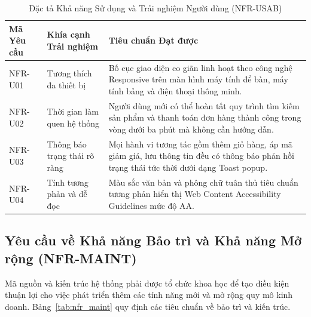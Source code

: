 \begin{table}[H]
\centering
\caption{Đặc tả Khả năng Sử dụng và Trải nghiệm Người dùng (NFR-USAB)}
\label{tab:nfr_usab}
\begin{tabularx}{\textwidth}{p{2.5cm}p{4.5cm}X}
\toprule
\textbf{Mã Yêu cầu} & \textbf{Khía cạnh Trải nghiệm} & \textbf{Tiêu chuẩn Đạt được} \\
\midrule
NFR-U01 & Tương thích đa thiết bị & Bố cục giao diện co giãn linh hoạt theo công nghệ Responsive trên màn hình máy tính để bàn, máy tính bảng và điện thoại thông minh. \\
\addlinespace
NFR-U02 & Thời gian làm quen hệ thống & Người dùng mới có thể hoàn tất quy trình tìm kiếm sản phẩm và thanh toán đơn hàng thành công trong vòng dưới ba phút mà không cần hướng dẫn. \\
\addlinespace
NFR-U03 & Thông báo trạng thái rõ ràng & Mọi hành vi tương tác gồm thêm giỏ hàng, áp mã giảm giá, lưu thông tin đều có thông báo phản hồi trạng thái tức thời dưới dạng Toast popup. \\
\addlinespace
NFR-U04 & Tính tương phản và dễ đọc & Màu sắc văn bản và phông chữ tuân thủ tiêu chuẩn tương phản hiển thị Web Content Accessibility Guidelines mức độ AA. \\
\bottomrule
\end{tabularx}
\end{table}

\subsection{Yêu cầu về Khả năng Bảo trì và Khả năng Mở rộng (NFR-MAINT)}
Mã nguồn và kiến trúc hệ thống phải được tổ chức khoa học để tạo điều kiện thuận lợi cho việc phát triển thêm các tính năng mới và mở rộng quy mô kinh doanh. Bảng~\ref{tab:nfr_maint} quy định các tiêu chuẩn về bảo trì và kiến trúc.

